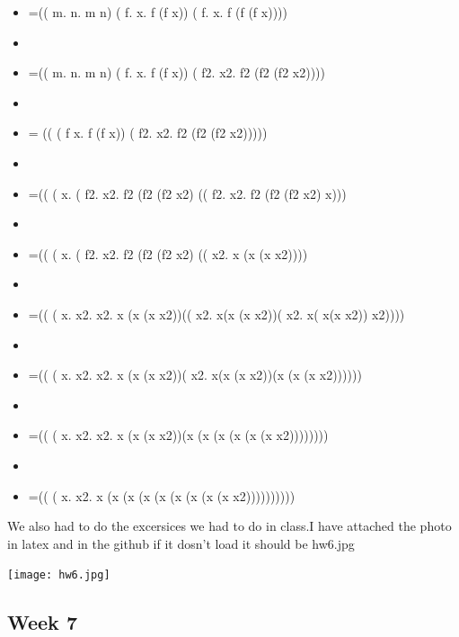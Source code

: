 \documentclass{article}
\theoremstyle{theorem}
\theoremstyle{definition}
\theoremstyle{remark}
\begin{document}
\begin{enumerate}
\begin{enumerate}
\begin{itemize}
\item =(( \lambda m. \lambda n. m n) ( \lambda f. \lambda x. f (f x)) ( \lambda f. \lambda x. f (f (f x))))
\item
\item =(( \lambda m. \lambda n. m n) ( \lambda f. \lambda x. f (f x)) ( \lambda f2. \lambda x2. f2 (f2 (f2 x2))))
\item
\item = (( ( \lambda f \lambda x. f (f x)) ( \lambda f2. \lambda x2. f2 (f2 (f2 x2)))))
\item
\item =(( ( \lambda x. ( \lambda f2. \lambda x2. f2 (f2 (f2 x2) (( \lambda f2. \lambda x2. f2 (f2 (f2 x2) x)))
\item
\item =(( ( \lambda x. ( \lambda f2. \lambda x2. f2 (f2 (f2 x2) (( \lambda x2. x (x (x x2))))
\item
\item =(( ( \lambda x. \lambda x2. \lambda x2. x (x (x x2))(( \lambda x2. x(x (x x2))( \lambda x2. x( x(x x2)) x2))))
\item
\item =(( ( \lambda x. \lambda x2. \lambda x2. x (x (x x2))( \lambda x2. x(x (x x2))(x (x (x x2))))))
\item
\item =(( ( \lambda x. \lambda x2. \lambda x2. x (x (x x2))(x (x (x (x (x (x x2))))))))
\item
\item =(( ( \lambda x. \lambda x2. x (x (x (x (x (x (x (x (x x2))))))))))
\end{itemize}
\end{enumerate}
We also had to do the excersices we had to do in class.I have attached the photo in latex and in the github if it dosn't load it should be hw6.jpg
\end{enumerate}
\texttt{[image: hw6.jpg]}
\subsection{Week 7}
\end{document}

